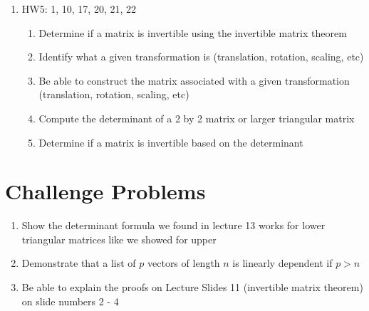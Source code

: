 \documentclass[12pt]{article}
\begin{document}
\begin{enumerate}
\begin{enumerate}
        \item Be able to construct the matrix associated with a given transformation
            (translation, rotation, scaling, etc)
        \item Determine if a given transformation is injective/surjective
        \item Determine when matrix-multiplication is defined and compute the matrix product
        \item Compute the transpose of a matrix
        \item Determine how many solutions invertible and non-invertible matrices can have.
    \end{enumerate}
    \item HW5: 1, 10, 17, 20, 21, 22
    \begin{enumerate}
        \item Determine if a matrix is invertible using the invertible matrix theorem
        \item Identify what a given transformation is (translation, rotation, scaling, etc)
        \item Be able to construct the matrix associated with a given transformation
            (translation, rotation, scaling, etc)
        \item Compute the determinant of a 2 by 2 matrix or larger triangular matrix
        \item Determine if a matrix is invertible based on the determinant
    \end{enumerate}
\end{enumerate}
\section{Challenge Problems}
\begin{enumerate}
         \item Show the determinant formula we found in lecture 13 works for lower triangular matrices like we showed for upper
         \item Demonstrate that a list of $p$ vectors of length $n$ is linearly dependent if $p>n$
         \item Be able to explain the proofs on Lecture Slides 11 (invertible matrix theorem) on slide numbers 2 - 4
\end{enumerate}
\end{document}
